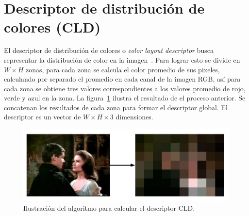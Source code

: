 \section{Descriptor de distribución de colores (CLD)}\label{cld}
El descriptor de distribución de colores o \emph{color layout descriptor} busca representar la distribución de color en la imagen~\cite{Katsuni:cld, Manjunath:desc}. Para lograr esto se divide en $W \times H$ zonas, para cada zona se calcula el color promedio de sus pixeles, calculando por separado el promedio en cada canal de la imagen RGB, así para cada zona se obtiene tres valores correspondientes a los valores promedio de rojo, verde y azul en la zona. La figura~\ref{descriptor_cld} ilustra el resultado de el proceso anterior.  Se concatenan los resultados de cada zona para formar el descriptor global. El descriptor es un vector de $W \times H \times 3$ dimensiones.
    \begin{figure}[!h]
		\centering
		\includegraphics[scale=0.4]{imagenes/cap3/descriptor_kf.png}
		\caption{Ilustración del algoritmo para calcular el descriptor CLD.}
		\label{descriptor_cld}
	\end{figure}

